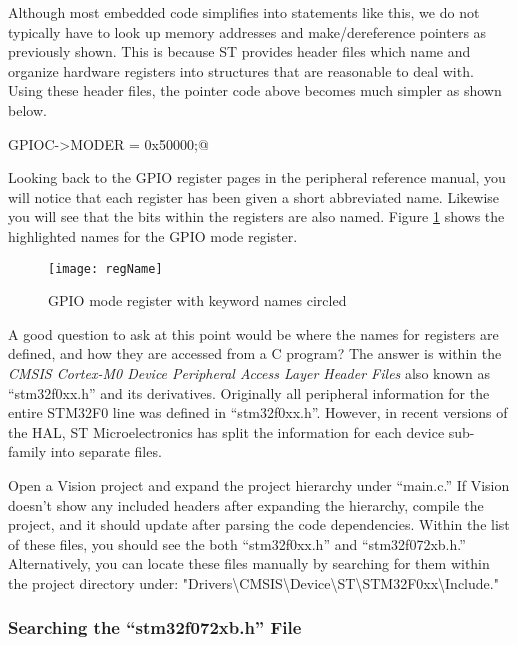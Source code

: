 \documentclass[11pt,fleqn]{book} %
\makeatletter
\newcommand{\ilcode}[1]{
    \smallskip
    \colorbox{gray!20!white}{
        \centering
        \parbox{\linewidth-2\fboxsep}{
            \lstinline@#1@
        }
    }
}
\makeatother
\begin{document}
Although most embedded code simplifies into statements like this, we do not typically have to look up memory addresses and make/dereference pointers as previously shown. This is because ST provides header files which name and organize hardware registers into structures that are reasonable to deal with. Using these header files, the pointer code above becomes much simpler as shown below.

\ilcode{GPIOC->MODER = 0x50000;}%
\smallskip


Looking back to the GPIO register pages in the peripheral reference manual, you will notice that each register has been given a short abbreviated name. Likewise you will see that the bits within the registers are also named. Figure \ref{regName} shows the highlighted names for the GPIO mode register. 

\begin{figure}[]
    \centering\texttt{[image: regName]}
    \caption{GPIO mode register with keyword names circled}
    \label{regName}
\end{figure}

A good question to ask at this point would be where the names for registers are defined, and how they are accessed from a C program? The answer is within the \textit{CMSIS Cortex-M0 Device Peripheral Access Layer Header Files} also known as ``stm32f0xx.h'' and its derivatives. Originally all peripheral information for the entire STM32F0 line was defined in ``stm32f0xx.h''. However, in recent versions of the HAL, ST Microelectronics has split the information for each device sub-family into separate files. 

Open a {\textmu}Vision project and expand the project hierarchy under ``main.c.'' If {\textmu}Vision doesn't show any included headers after expanding the hierarchy, compile the project, and it should update after parsing the code dependencies. Within the list of these files, you should see the both ``stm32f0xx.h'' and ``stm32f072xb.h.''  Alternatively, you can locate these files manually by searching for them within the project directory under: "Drivers\textbackslash CMSIS\textbackslash Device\textbackslash ST\textbackslash STM32F0xx\textbackslash Include." 

\subsubsection{Searching the ``stm32f072xb.h'' File}
\end{document}
